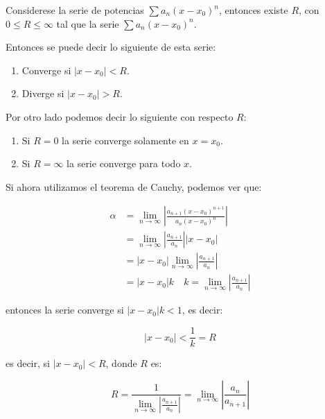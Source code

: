 		\begin{teorema}
			Considerese la serie de potencias $\sum a_n(x - x_0)^n$, entonces existe $R$, con $0 \leq R \leq \infty$ tal que la serie $\sum a_n (x - x_0)^n$.

			Entonces se puede decir lo siguiente de esta serie:

			\begin{enumerate}
				\item Converge si $|x - x_0| < R$.
				\item Diverge si $|x - x_0| > R$.
			\end{enumerate}

			Por otro lado podemos decir lo siguiente con respecto $R$:

			\begin{enumerate}
				\item Si $R = 0$ la serie converge solamente en $x = x_0$.
				\item Si $R = \infty$ la serie converge para todo $x$.
			\end{enumerate}

			Si ahora utilizamos el teorema de Cauchy, podemos ver que:

			\begin{align*}
				\alpha &= \lim_{n \to \infty} \left| \frac{a_{n+1}(x - x_0)^{n+1}}{a_n (x - x_0)^n} \right| \\
				&= \lim_{n \to \infty} \left| \frac{a_{n+1}}{a_n} \right| |x - x_0| \\
				&= |x - x_0| \lim_{n \to \infty} \left| \frac{a_{n+1}}{a_n} \right| \\
				&= |x - x_0| k \quad k = \lim_{n \to \infty} \left| \frac{a_{n+1}}{a_n} \right|
			\end{align*}

			entonces la serie converge si $|x - x_0|k < 1$, es decir:

			\begin{equation*}
				|x - x_0| < \frac{1}{k} = R
			\end{equation*}

			es decir, si $|x - x_0| < R$, donde $R$ es:

			\begin{equation*}
				R = \frac{1}{\lim_{n \to \infty} \left| \frac{a_{n+1}}{a_n} \right|} = \lim_{n \to \infty} \left| \frac{a_{n}}{a_{n+1}} \right|
			\end{equation*}
		\end{teorema}

		\begin{ejemplo}
		\end{ejemplo}

